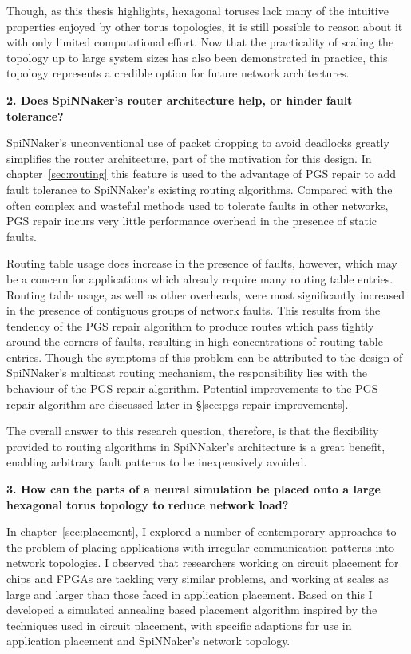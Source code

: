 		Though, as this thesis highlights, hexagonal toruses lack many of the
		intuitive properties enjoyed by other torus topologies, it is still
		possible to reason about it with only limited computational effort.  Now
		that the practicality of scaling the topology up to large system sizes has
		also been demonstrated in practice, this topology represents a credible
		option for future network architectures.
		
		\vspace*{1.0em}
		\noindent%
		\textbf{2. Does SpiNNaker's router architecture help, or hinder fault
		tolerance?}
		
		SpiNNaker's unconventional use of packet dropping to avoid deadlocks
		greatly simplifies the router architecture, part of the motivation for this
		design. In chapter~\ref{sec:routing} this feature is used to the advantage
		of PGS repair to add fault tolerance to SpiNNaker's existing routing
		algorithms. Compared with the often complex and wasteful methods used to
		tolerate faults in other networks, PGS repair incurs very little
		performance overhead in the presence of static faults.
		
		Routing table usage does increase in the presence of faults, however, which
		may be a concern for applications which already require many routing table
		entries. Routing table usage, as well as other overheads, were most
		significantly increased in the presence of contiguous groups of network
		faults. This results from the tendency of the PGS repair algorithm to
		produce routes which pass tightly around the corners of faults, resulting
		in high concentrations of routing table entries.  Though the symptoms of
		this problem can be attributed to the design of SpiNNaker's multicast
		routing mechanism, the responsibility lies with the behaviour of the PGS
		repair algorithm. Potential improvements to the PGS repair algorithm are
		discussed later in \S\ref{sec:pgs-repair-improvements}.
		
		The overall answer to this research question, therefore, is that the
		flexibility provided to routing algorithms in SpiNNaker's architecture is a
		great benefit, enabling arbitrary fault patterns to be inexpensively
		avoided.
		
		\vspace*{1.0em}
		\noindent%
		\textbf{3. How can the parts of a neural simulation be placed onto a large
		hexagonal torus topology to reduce network load?}
		
		In chapter~\ref{sec:placement}, I explored a number of contemporary
		approaches to the problem of placing applications with irregular
		communication patterns into network topologies. I observed that researchers
		working on circuit placement for chips and FPGAs are tackling very similar
		problems, and working at scales as large and larger than those faced in
		application placement. Based on this I developed a simulated annealing
		based placement algorithm inspired by the techniques used in circuit
		placement, with specific adaptions for use in application placement and
		SpiNNaker's network topology.
		
